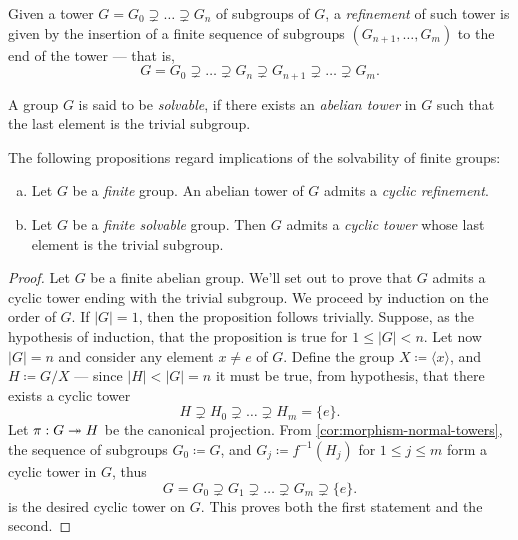 \begin{definition}[Refinement]
    \label{def:refinement-tower}
    Given a tower \(G = G_0 \supsetneq \dots \supsetneq G_n\) of subgroups of \(G\),
    a \emph{refinement} of such tower is given by the insertion of a finite
    sequence of subgroups \((G_{n+1}, \dots, G_m)\) to the end of the tower --- that
    is,
    \[
        G = G_{0} \supsetneq \dots \supsetneq G_n \supsetneq G_{n+1} \supsetneq \dots
        \supsetneq G_{m}.
    \]
\end{definition}

\begin{definition}
    \label{def:solvable-group}
    A group \(G\) is said to be \emph{solvable}, if there exists an \emph{abelian
        tower} in \(G\) such that the last element is the trivial subgroup.
\end{definition}

\begin{proposition}
    \label{prop:finite-grp-cyclic-refinement}
    The following propositions regard implications of the solvability of finite
    groups:
    \begin{enumerate}[(a)]\setlength\itemsep{0em}
        \item Let \(G\) be a \emph{finite} group. An abelian tower of \(G\) admits a
              \emph{cyclic refinement}.
        \item Let \(G\) be a \emph{finite solvable} group. Then \(G\) admits a
              \emph{cyclic tower} whose last element is the trivial subgroup.
    \end{enumerate}
\end{proposition}

\begin{proof}
    Let \(G\) be a finite abelian group. We'll set out to prove that \(G\) admits a
    cyclic tower ending with the trivial subgroup. We proceed by induction on the
    order of \(G\). If \(|G| = 1\), then the proposition follows trivially. Suppose,
    as the hypothesis of induction, that the proposition is true for \(1 \leq |G| <
    n\). Let now \(|G| = n\) and consider any element \(x \neq e\) of \(G\). Define
    the group \(X \coloneq \langle x \rangle\), and \(H \coloneq G/X\) --- since
    \(|H| < |G| = n\) it must be true, from hypothesis, that there exists a cyclic
    tower
    \[
        H \supsetneq H_0 \supsetneq \dots \supsetneq H_m = \{e\}.
    \]
    Let \(\pi: G \twoheadrightarrow H\) be the canonical projection. From
    \cref{cor:morphism-normal-towers}, the sequence of subgroups \(G_0 \coloneq G\),
    and \(G_j \coloneq f^{-1}(H_j)\) for \(1 \leq j \leq m\) form a cyclic tower in
    \(G\), thus
    \[
        G = G_0 \supsetneq G_1 \supsetneq \dots \supsetneq G_m \supsetneq \{e\}.
    \]
    is the desired cyclic tower on \(G\). This proves both the first statement and
    the second.
\end{proof}


